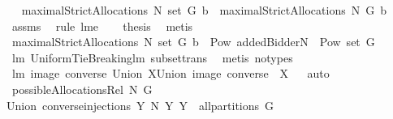 \begin{isabellebody}
\isamarkupfalse%
\ \isamarkupfalse%
\ {\isachardoublequoteopen}maximalStrictAllocations{\isacharprime}\ N\ {\isacharparenleft}set\ G{\isacharparenright}\ b\ {\isacharequal}\ maximalStrictAllocations\ N\ G\ b{\isachardoublequoteclose}\ \isanewline
{}\isamarkupfalse%
\ assms{\isacharparenleft}{}{\isacharcomma}{}{\isacharparenright}\ \isamarkupfalse%
\ {\isacharparenleft}rule\ lm{}{}e{\isacharparenright}\ \isamarkupfalse%
\ \isamarkupfalse%
\ {\isacharquery}thesis\ \isamarkupfalse%
\ metis\isanewline
{}\isamarkupfalse%
%
\endisatagproof
{\isafoldproof}%
%
\isadelimproof
\isanewline
%
\endisadelimproof
\isanewline
{}\isamarkupfalse%
\ {\isachardoublequoteopen}maximalStrictAllocations{\isacharprime}\ N\ {\isacharparenleft}set\ G{\isacharparenright}\ b\ {\isasymsubseteq}\ Pow\ {\isacharparenleft}{\isacharparenleft}{\isacharbraceleft}addedBidder{\isacharprime}{\isacharbraceright}{\isasymunion}N{\isacharparenright}\ {\isasymtimes}\ {\isacharparenleft}Pow\ {\isacharparenleft}set\ G{\isacharparenright}\ {\isacharminus}\ {\isacharbraceleft}{\isacharbraceleft}{\isacharbraceright}{\isacharbraceright}{\isacharparenright}{\isacharparenright}{\isachardoublequoteclose}\isanewline
%
\isadelimproof
%
\endisadelimproof
%
\isatagproof
{}\isamarkupfalse%
\ lm{}{}\ UniformTieBreaking{\isachardot}lm{}{}\ subset{\isacharunderscore}trans\ \isamarkupfalse%
\ {\isacharparenleft}metis\ {\isacharparenleft}no{\isacharunderscore}types{\isacharparenright}{\isacharparenright}%
\endisatagproof
{\isafoldproof}%
%
\isadelimproof
\isanewline
%
\endisadelimproof
\isanewline
{}\isamarkupfalse%
\ lm{}{}{\isacharcolon}\ {\isachardoublequoteopen}{\isacharparenleft}image\ converse{\isacharparenright}\ {\isacharparenleft}Union\ X{\isacharparenright}{\isacharequal}Union\ {\isacharparenleft}{\isacharparenleft}image\ converse{\isacharparenright}\ {\isacharbackquote}\ X{\isacharparenright}{\isachardoublequoteclose}%
\isadelimproof
\ %
\endisadelimproof
%
\isatagproof
{}\isamarkupfalse%
\ auto%
\endisatagproof
{\isafoldproof}%
%
\isadelimproof
%
\endisadelimproof
\isanewline
\isanewline
{}\isamarkupfalse%
\ {\isachardoublequoteopen}possibleAllocationsRel\ N\ G\ {\isacharequal}\isanewline
Union\ {\isacharbraceleft}converse{\isacharbackquote}{\isacharparenleft}injections\ Y\ N{\isacharparenright}{\isacharbar}\ Y{\isachardot}\ Y\ {\isasymin}\ all{\isacharunderscore}partitions\ G{\isacharbraceright}{\isachardoublequoteclose}\ \isanewline

\end{isabellebody}
